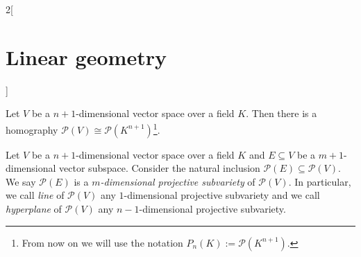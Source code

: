 \documentclass[../../../main.tex]{subfiles}
\begin{document}
\begin{multicols}{2}[\section{Linear geometry}]
\begin{definition}
  \end{definition}
  \begin{proposition}
    Let $V$ be a $n+1$-dimensional vector space over a field $K$. Then there is a homography $\mathcal{P}(V)\cong \mathcal{P}(K^{n+1})$\footnote{From now on we will use the notation $P_n(K):=\mathcal{P}(K^{n+1})$.}.
  \end{proposition}
  \begin{definition}
    Let $V$ be a $n+1$-dimensional vector space over a field $K$ and $E\subseteq V$ be a $m+1$-dimensional vector subspace. Consider the natural inclusion $\mathcal{P}(E)\subseteq\mathcal{P}(V)$. We say $\mathcal{P}(E)$ is a \emph{$m$-dimensional projective subvariety} of $\mathcal{P}(V)$. In particular, we call \emph{line} of $\mathcal{P}(V)$ any $1$-dimensional projective subvariety and we call \emph{hyperplane} of $\mathcal{P}(V)$ any $n-1$-dimensional projective subvariety.
  \end{definition}

\end{multicols}
\end{document}
